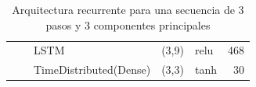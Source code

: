\begin{table}[]
\begin{center}
\begin{tabular}{ll|l|r|l|r|}
\multicolumn{1}{|l|}{}                              &                             & LSTM                               & (3,9)                                & relu                                     & 468                                         \\ \cline{3-6} 
\multicolumn{1}{|l|}{}                              &                             & TimeDistributed(Dense)             & (3,3)                                & tanh                                     & 30                                          \\ \hline
\end{tabular}
\end{center}
\caption{Arquitectura recurrente para una secuencia de 3 pasos y 3 componentes principales}
\label{table:rnn33}
\end{table}


\vspace{5mm} %



\vspace{5mm} %